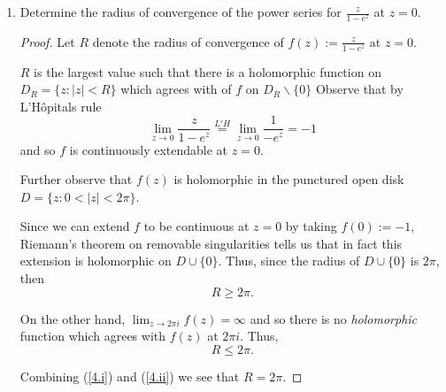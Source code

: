 \documentclass{article}
\begin{document}
\begin{enumerate}
\begin{proof}
Now, since along the real axis, $f(z) = \frac{\cos tz}{1+z^2}$ we have that it is an even function so
\[2 \int_{[0,R]} f(z) dz = \int_{[-R,0)} f(z) dz + \int_{[0,R]} f(z) dz.\]
Thus, we can rewrite the integral which we had previously broken up as
\[\pi e^{-t} = \int_{\gamma_R} f(z) dz = 2\int_{[0,R]} f(z) dz + \int_{\gamma^\prime_R} f(z)dz \leq 2\int_{[0,R]} f(z) dz + \frac\pi R.\]
Taking the limit as $R\rightarrow \infty$, we see that
\[\pi e^{-t} = 2\int_{[0,\infty]} f(z) dz + 0.\]
or that
\[ \frac{\pi e^{-t}}{2} = \int_0^\infty \frac{\cos(tx) }{1+x^2} dx \]
\end{proof}


\setcounter{enumi}{3}

\item Determine the radius of convergence of the power series for $\frac{z}{1-e^z}$ at $z=0$.

\begin{proof}
	Let $R$ denote the radius of convergence of $f(z):= \frac{z}{1-e^z}$ at $z=0$.
	
	$R$ is the largest value such that there is a holomorphic function on $D_R = \{ z : |z| < R\}$ which agrees with of $f$ on $D_R \backslash \{0\}$
	Observe that by L'H\^{o}pitals rule
	\[\lim_{z \rightarrow 0} \frac{z}{1-e^z} \stackrel{L'H}{=} \lim_{z \rightarrow 0} \frac{1}{-e^z} = -1\]
	and so $f$ is continuously extendable at $z=0$. 
	
	Further observe that $f(z)$ is holomorphic in the punctured open disk $D = \{ z : 0< |z| < 2\pi\}$. 
	
	Since we can extend $f$ to be continuous at $z=0$ by taking $f(0):=-1$, Riemann's theorem on removable singularities tells us that in fact this extension is holomorphic on $D \cup \{0\}$. Thus, since the radius of $D\cup\{0\}$ is $2\pi$, then 
	\begin{equation}\label{4.i}R \geq 2\pi .\end{equation}
	
	On the other hand, $\lim_{z \rightarrow 2\pi i} f(z) = \infty$ and so there is no \textit{holomorphic} function which agrees with $f(z)$ at $2\pi i$. Thus, \begin{equation} \label{4.ii} R\leq 2\pi. \end{equation} 
	
	Combining (\ref{4.i}) and (\ref{4.ii}) we see that $R = 2\pi$.
\end{proof}	


\end{enumerate}
\end{document}
